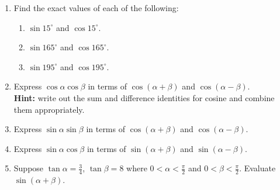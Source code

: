 \documentclass[12pt]{article}
\newif\ifans
\begin{document}
\begin{enumerate}

\item Find the exact values of each of the following:

\begin{enumerate}

\item $\sin15^\circ$ and $\cos15^\circ$.

\ifans\fbox{$\sin15^\circ=\frac{\sqrt{6}-\sqrt{2}}{4}$ and $\cos15^\circ=\frac{\sqrt{6}+\sqrt{2}}{4}$} \fi

\item $\sin165^\circ$ and $\cos165^\circ$.

\ifans\fbox{$\sin165^\circ=\frac{\sqrt{6}-\sqrt{2}}{4}$ and $\cos165^\circ=-\,\frac{\sqrt{6}+\sqrt{2}}{4}$} \fi

\item $\sin195^\circ$ and $\cos195^\circ$.

\ifans\fbox{$\sin195^\circ=\frac{\sqrt{2}-\sqrt{6}}{4}$ and $\cos195^\circ=-\,\frac{\sqrt{6}+\sqrt{2}}{4}$} \fi

\end{enumerate}

\item Express $\cos{\alpha}\cos{\beta}$ in terms of $\cos{(\alpha+\beta)}$ and $\cos{(\alpha-\beta)}$.\\  {\bf Hint:} write out the sum and difference identities for cosine and combine them appropriately.

\ifans\fbox{$\frac{1}{2}\left[\cos(\alpha-\beta)+\cos(\alpha+\beta)\right]$} \fi

\item Express $\sin{\alpha}\sin{\beta}$ in terms of $\cos{(\alpha+\beta)}$ and $\cos{(\alpha-\beta)}$.

\ifans\fbox{$\frac{1}{2}\left[\cos(\alpha-\beta)-\cos(\alpha+\beta)\right]$} \fi

\item Express $\sin{\alpha}\cos{\beta}$ in terms of $\sin{(\alpha+\beta)}$ and $\sin{(\alpha-\beta)}$.

\ifans\fbox{$\frac{1}{2}\left[\sin(\alpha-\beta)+\sin(\alpha+\beta)\right]$} \fi

\item Suppose $\tan\alpha=\frac{3}{4}$, $\tan\beta=8$ where $0<\alpha<\frac{\pi}{2}$ and $0<\beta<\frac{\pi}{2}$.  Evaluate $\sin(\alpha+\beta)$.

\ifans\fbox{$\frac{7}{\sqrt{65}}$} \fi


\end{enumerate}
\end{document}
